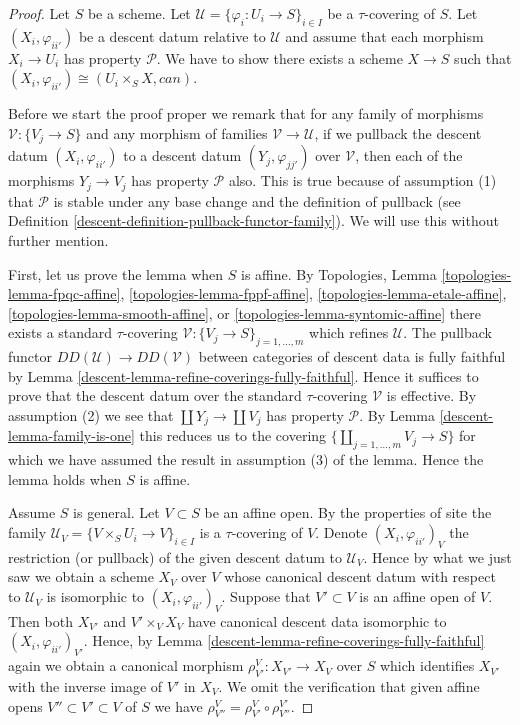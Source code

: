\begin{proof}

Let $S$ be a scheme.
Let $\mathcal{U} = \{\varphi_i : U_i \to S\}_{i \in I}$
be a $\tau$-covering of $S$.
Let $(X_i, \varphi_{ii'})$ be a descent datum relative to
$\mathcal{U}$ and assume that each morphism $X_i \to U_i$ has property
$\mathcal{P}$. We have to show there exists a scheme $X \to S$ such that
$(X_i, \varphi_{ii'}) \cong (U_i \times_S X, can)$.

\medskip\noindent
Before we start the proof proper we remark that for any
family of morphisms $\mathcal{V} : \{V_j \to S\}$ and any
morphism of families $\mathcal{V} \to \mathcal{U}$, if we pullback
the descent datum $(X_i, \varphi_{ii'})$ to a descent datum
$(Y_j, \varphi_{jj'})$ over $\mathcal{V}$, then each of the
morphisms $Y_j \to V_j$ has property $\mathcal{P}$ also.
This is true because of assumption (1) that $\mathcal{P}$ is stable
under any base change and the definition of pullback
(see Definition \ref{descent-definition-pullback-functor-family}).
We will use this without further mention.

\medskip\noindent
First, let us prove the lemma when $S$ is affine.
By Topologies, Lemma
\ref{topologies-lemma-fpqc-affine},
\ref{topologies-lemma-fppf-affine},
\ref{topologies-lemma-etale-affine},
\ref{topologies-lemma-smooth-affine}, or
\ref{topologies-lemma-syntomic-affine}
there exists a standard $\tau$-covering
$\mathcal{V} : \{V_j \to S\}_{j = 1, \ldots, m}$
which refines $\mathcal{U}$. The pullback functor
$DD(\mathcal{U}) \to DD(\mathcal{V})$
between categories of descent data is fully faithful
by Lemma \ref{descent-lemma-refine-coverings-fully-faithful}.
Hence it suffices to prove that the descent datum over
the standard $\tau$-covering $\mathcal{V}$ is effective.
By assumption (2) we see that $\coprod Y_j \to \coprod V_j$
has property $\mathcal{P}$.
By Lemma \ref{descent-lemma-family-is-one} this reduces us to the covering
$\{\coprod_{j = 1, \ldots, m} V_j \to S\}$ for which we have
assumed the result in assumption (3) of the lemma.
Hence the lemma holds when $S$ is affine.

\medskip\noindent
Assume $S$ is general. Let $V \subset S$ be an affine open.
By the properties of site the family
$\mathcal{U}_V = \{V \times_S U_i \to V\}_{i \in I}$ is a
$\tau$-covering of $V$. Denote
$(X_i, \varphi_{ii'})_V$ the restriction (or pullback) of
the given descent datum to $\mathcal{U}_V$.
Hence by what we just saw we obtain a scheme $X_V$ over $V$
whose canonical descent datum with respect to
$\mathcal{U}_V$ is isomorphic to $(X_i, \varphi_{ii'})_V$.
Suppose that $V' \subset V$ is an affine open of $V$.
Then both $X_{V'}$ and $V' \times_V X_V$ have canonical
descent data isomorphic to $(X_i, \varphi_{ii'})_{V'}$.
Hence, by Lemma \ref{descent-lemma-refine-coverings-fully-faithful}
again we obtain a canonical morphism
$\rho^V_{V'} : X_{V'} \to X_V$ over $S$ which identifies
$X_{V'}$ with the inverse image of $V'$ in $X_V$.
We omit the verification that given affine opens
$V'' \subset V' \subset V$ of $S$ we have
$\rho^V_{V''} = \rho^V_{V'} \circ \rho^{V'}_{V''}$.


\end{proof}
